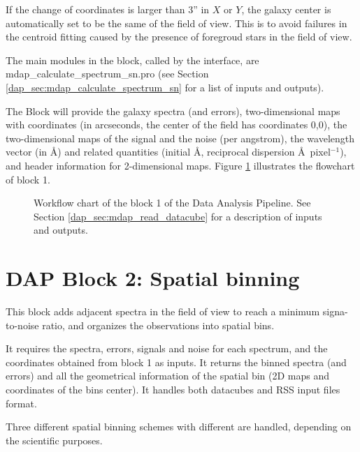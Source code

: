 \documentclass[11pt]{book}
\begin{document}
If the change of coordinates is larger than 3'' in $X$ or $Y$, the
galaxy center is automatically set to be the same of the field of
view. This is to avoid failures in the centroid fitting caused by the
presence of foregroud stars in the field of view.

The main modules in the block, called by the interface, are
mdap\_calculate\_spectrum\_sn.pro (see Section
\ref{dap_sec:mdap_calculate_spectrum_sn} for a list of inputs and
outputs).

The Block will provide the galaxy spectra (and errors),
two-dimensional maps with coordinates (in arcseconds, the center of
the field has coordinates 0,0), the two-dimensional maps of the signal
and the noise (per angstrom), the wavelength vector (in \AA) and
related quantities (initial \AA, reciprocal dispersion
\AA\ pixel$^{-1}$), and header information for 2-dimensional
maps. Figure \ref{dap_fig:block1} illustrates the flowchart of block
1.


\begin{figure}
\begin{center}
\caption{Workflow chart of the block 1 of the Data Analysis
  Pipeline. See Section \ref{dap_sec:mdap_read_datacube} for a
  description of inputs and outputs.}
 \label{dap_fig:block1}
\end{center}
\end{figure}





\section[DAP Block 2: Spatial binning]{DAP Block 2: Spatial binning}
\label{dap_sec:block2}

This block adds adjacent spectra in the field of view to reach a
minimum signa-to-noise ratio, and organizes the observations into
spatial bins. 

It requires the spectra, errors, signals and noise for each spectrum,
and the coordinates obtained from block 1 as inputs. It returns the
binned spectra (and errors) and all the geometrical information of the
spatial bin (2D maps and coordinates of the bins center). It handles
both datacubes and RSS input files format.

Three different spatial binning schemes with different
are handled, depending on the scientific purposes.
\end{document}
